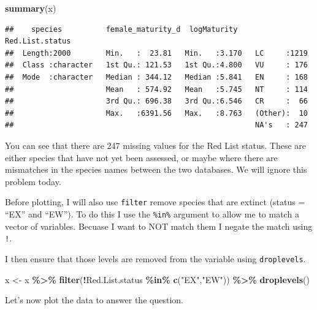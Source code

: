 \documentclass[
  a4paperpaper,
]{book}
\newenvironment{Shaded}{\begin{snugshade}}{\end{snugshade}}
\newcommand{\DataTypeTok}[1]{\textcolor[rgb]{0.13,0.29,0.53}{#1}}
\newcommand{\KeywordTok}[1]{\textcolor[rgb]{0.13,0.29,0.53}{\textbf{#1}}}
\newcommand{\NormalTok}[1]{#1}
\newcommand{\OperatorTok}[1]{\textcolor[rgb]{0.81,0.36,0.00}{\textbf{#1}}}
\newcommand{\StringTok}[1]{\textcolor[rgb]{0.31,0.60,0.02}{#1}}
\begin{document}
\begin{Shaded}
\begin{Highlighting}[]
\KeywordTok{summary}\NormalTok{(x)}
\end{Highlighting}
\end{Shaded}

\begin{verbatim}
##    species          female_maturity_d  logMaturity    Red.List.status
##  Length:2000        Min.   :  23.81   Min.   :3.170   LC     :1219   
##  Class :character   1st Qu.: 121.53   1st Qu.:4.800   VU     : 176   
##  Mode  :character   Median : 344.12   Median :5.841   EN     : 168   
##                     Mean   : 574.92   Mean   :5.745   NT     : 114   
##                     3rd Qu.: 696.38   3rd Qu.:6.546   CR     :  66   
##                     Max.   :6391.56   Max.   :8.763   (Other):  10   
##                                                       NA's   : 247
\end{verbatim}

You can see that there are 247 missing values for the Red List status. These are either species that have not yet been assessed, or maybe where there are mismatches in the species names between the two databases. We will ignore this problem today.

Before plotting, I will also use \texttt{filter} remove species that are extinct (status = ``EX'' and ``EW''). To do this I use the \texttt{\%in\%} argument to allow me to match a vector of variables. Becuase I want to NOT match them I negate the match using \texttt{!}.

I then ensure that those levels are removed from the variable using \texttt{droplevels}.

\begin{Shaded}
\begin{Highlighting}[]
\NormalTok{x \textless{}{-}}\StringTok{ }\NormalTok{x }\OperatorTok{\%\textgreater{}\%}
\StringTok{  }\KeywordTok{filter}\NormalTok{(}\OperatorTok{!}\NormalTok{Red.List.status }\OperatorTok{\%in\%}\StringTok{ }\KeywordTok{c}\NormalTok{(}\StringTok{"EX"}\NormalTok{,}\StringTok{"EW"}\NormalTok{)) }\OperatorTok{\%\textgreater{}\%}
\StringTok{  }\KeywordTok{droplevels}\NormalTok{()}
\end{Highlighting}
\end{Shaded}

Let's now plot the data to answer the question.

\begin{Shaded}
\end{Shaded}
\end{document}
